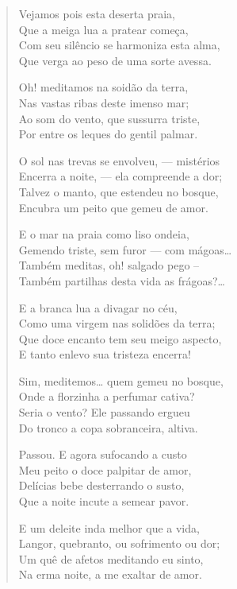 \begin{verse}
Vejamos pois esta deserta praia,\\
Que a meiga lua a pratear começa,\\
Com seu silêncio se harmoniza esta alma,\\
Que verga ao peso de uma sorte avessa.

Oh! meditamos na soidão da terra,\\
Nas vastas ribas deste imenso mar;\\
Ao som do vento, que sussurra triste,\\
Por entre os leques do gentil palmar.

O sol nas trevas se envolveu, --- mistérios\\
Encerra a noite, --- ela compreende a dor;\\
Talvez o manto, que estendeu no bosque,\\
Encubra um peito que gemeu de amor.

E o mar na praia como liso ondeia,\\
Gemendo triste, sem furor --- com mágoas\ldots{}\\
Também meditas, oh! salgado pego --\\
Também partilhas desta vida as frágoas?\ldots{}

E a branca lua a divagar no céu,\\
Como uma virgem nas solidões da terra;\\
Que doce encanto tem seu meigo aspecto,\\
E tanto enlevo sua tristeza encerra!

Sim, meditemos\ldots{} quem gemeu no bosque,\\
Onde a florzinha a perfumar cativa?\\
Seria o vento? Ele passando ergueu\\
Do tronco a copa sobranceira, altiva.

Passou. E agora sufocando a custo\\
Meu peito o doce palpitar de amor,\\
Delícias bebe desterrando o susto,\\
Que a noite incute a semear pavor.

E um deleite inda melhor que a vida,\\
Langor, quebranto, ou sofrimento ou dor;\\
Um quê de afetos meditando eu sinto,\\
Na erma noite, a me exaltar de amor.


\end{verse}
